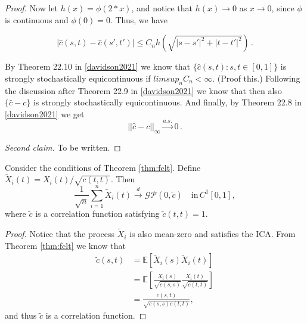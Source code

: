 \begin{proof}
    Now let $h(x) = \phi(2 * x)$, and notice that $h(x) \to 0$ as $x \to 0$, since
    $\phi$ is continuous and $\phi(0) = 0$. Thus, we have

    \[
        |\hat{c}(s, t) - \hat{c}(s', t')| \leq C_n h(\sqrt{|s - s'|^2 + |t - t'|^2}) \,.
    \]

    By Theorem 22.10 in \ref{davidson2021} we know that $\{\hat{c}(s, t) : s, t \in [0, 1]\}$
    is strongly stochastically equicontinuous if $limsup_n C_n < \infty$. (Proof this.)
    Following the discussion after Theorem 22.9 in \ref{davidson2021} we know that then
    also $\{\hat{c} - c\}$ is strongly stochastically equicontinuous. And finally, by
    Theorem 22.8 in \ref{davidson2021} we get
    \[
        ||\hat{c} - c||_\infty \overset{a.s.}{\to} 0 \,.
    \]

    \emph{Second claim.}
    To be written.
\end{proof}


\begin{corollary}
    Consider the conditions of Theorem  \ref{thm:fclt}. Define $\tilde{X}_i(t)
    = X_i(t) / \sqrt{c(t, t)}$. Then
    \[
        \frac{1}{\sqrt{n}} \sum_{i = 1}^n \tilde{X}_i(t) \overset{d}{\to}
        \mathcal{GP}(0, \tilde{c}) \quad \text{in} \, C^1[0, 1],
    \]
    where $\tilde{c}$ is a correlation function satisfying $\tilde{c}(t, t) = 1$.
\end{corollary}
\begin{proof}
    Notice that the process $\tilde{X}_i$ is also mean-zero and satisfies the ICA. From
    Theorem \ref{thm:fclt} we know that
    \begin{align}
        \tilde{c}(s, t) &= \mathbb{E}[\tilde{X}_i(s)\tilde{X}_i(t)] \\
        &= \mathbb{E}\left[\frac{X_i(s)}{\sqrt{c(s, s)}} \frac{X_i(t)}{\sqrt{c(t, t)}}\right] \\
        &= \frac{c(s, t)}{\sqrt{c(s, s) c(t, t)}},
    \end{align}
    and thus $\tilde{c}$ is a correlation function.
\end{proof}
